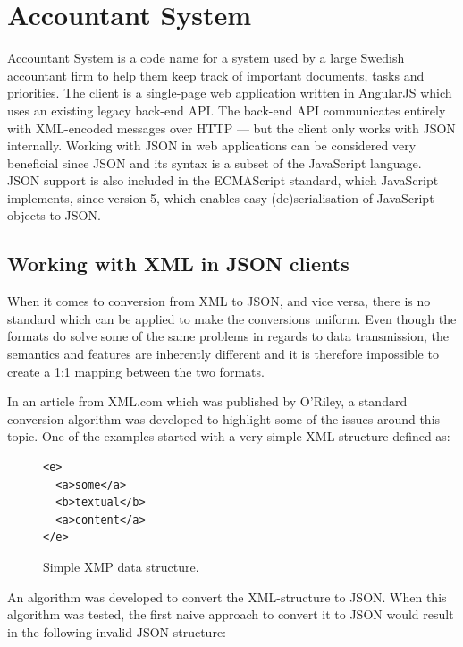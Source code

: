 \documentclass{cslthse-msc}
\begin{document}
\chapter{Accountant System}

Accountant System is a code name for a system used by a large Swedish accountant firm to help them keep track of important documents, tasks and priorities. The client is a single-page web application written in AngularJS which uses an existing legacy back-end API. The back-end API communicates entirely with XML-encoded messages over HTTP --- but the client only works with JSON internally. Working with JSON in web applications can be considered very beneficial since JSON and its syntax is a subset of the JavaScript language. JSON support is also included in the ECMAScript standard, which JavaScript implements, since version 5\cite{ecmascript_5}, which enables easy (de)serialisation of JavaScript objects to JSON.

\section{Working with XML in JSON clients}
\label{xml_json}

When it comes to conversion from XML to JSON, and vice versa, there is no standard which can be applied to make the conversions uniform. Even though the formats do solve some of the same problems in regards to data transmission, the semantics and features are inherently different and it is therefore impossible to create a 1:1 mapping between the two formats.

In an article from XML.com\cite{xml_json} which was published by O'Riley, a standard conversion algorithm was developed to highlight some of the issues around this topic. One of the examples started with a very simple XML structure defined as:

\begin{figure}[H]
  \centering
    \begin{center}
\begin{lstlisting}[breaklines=true,frame=single]
<e>
  <a>some</a>
  <b>textual</b>
  <a>content</a>
</e>
\end{lstlisting}
    \end{center}
  \caption{Simple XMP data structure.}
\end{figure}



An algorithm was developed to convert the XML-structure to JSON. When this algorithm was tested, the first naive approach to convert it to JSON would result in the following invalid JSON structure:
\end{document}
